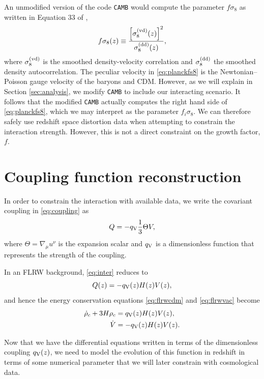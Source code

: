 \documentclass[a4paper,fleqn,usenatbib]{mnras}
\newcommand*{\qv}{$q_{\rm V}(z)$}
\begin{document}
An unmodified version of the code \texttt{CAMB} would compute the parameter $f \sigma_8$ as written in Equation 33 of \cite{Ade:2015xua},
\begin{align}
f \sigma_8 (z) \equiv \frac{\left[\sigma_8^{(\rm vd)}(z)\right]^2}{\sigma_8^{(\rm dd)}(z)} \label{eq:planckfs8},
\end{align}
where $\sigma_8^{(\rm vd)}$ is the smoothed density-velocity correlation and $\sigma_8^{(\rm dd)}$ the smoothed density autocorrelation. The peculiar velocity in \eqref{eq:planckfs8} is the Newtonian--Poisson gauge velocity of the baryons and CDM. However, as we will explain in Section \ref{sec:analysis}, we modify \texttt{CAMB} to include our interacting scenario. It follows that the modified \texttt{CAMB} actually computes the right hand side of \eqref{eq:planckfs8}, which we may interpret as the parameter $f_i \sigma_8$. We can therefore safely use redshift space distortion data when attempting to constrain the interaction strength. However, this is not a direct constraint on the growth factor, $f$.

\section{Coupling function reconstruction}\label{sec:qreconst}
In order to constrain the interaction with available data, we write the covariant coupling in \eqref{eq:coupling} as
\begin{equation}\label{eq:inter}
Q = -q_{\rm V} \frac{1}{3} \Theta V,
\end{equation}
where $\Theta = \nabla_\mu u^\nu$ is the expansion scalar and $q_{\rm V}$ is a dimensionless function that represents the strength of the coupling.

In an FLRW background, \eqref{eq:inter} reduces to
\begin{equation}\label{eq:bigQ}
Q(z) = -q_{\rm V}(z) H(z) V(z),
\end{equation}
and hence the energy conservation equations \eqref{eq:flrwcdm} and \eqref{eq:flrwvac} become
\begin{align}
\dot{\rho}_c + 3H\rho_c &= q_{\rm V}(z) H(z) V(z), \label{eq:qcdm} \\
\dot{V} &= -q_{\rm V}(z) H(z) V(z) \label{eq:qvac}.
\end{align}

Now that we have the differential equations written in terms of the dimensionless coupling \qv, we need to model the evolution of this function in redshift in terms of some numerical parameter that we will later constrain with cosmological data.
\end{document}
